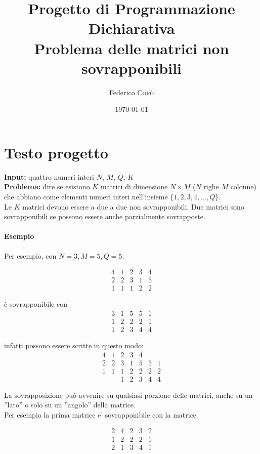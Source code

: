 \documentclass{article}
\title{{\Large Progetto di Programmazione Dichiarativa} \\ Problema delle matrici non sovrapponibili} %
\author{Federico \textsc{Corò}} %
\date{\today} %
\begin{document}
\maketitle

\section*{Testo progetto}
\textbf{Input:} quattro numeri interi $N$, $M$, $Q$, $K$\\
\textbf{Problema:} dire se esistono $K$ matrici di dimensione $N\times M$ ($N$ righe $M$ colonne)
che abbiano come elementi numeri interi nell'insieme $\{1,2,3,4,\dots,Q\}$.\\
Le $K$ matrici devono essere a due a due non sovrapponibili. Due matrici sono sovrapponibili se possono essere anche parzialmente sovrapposte.

\paragraph*{Esempio}
Per esempio, con $N=3, M=5, Q=5$:

$$
\begin{array}{ccccc}
4 & 1 & 2 & 3 & 4 \\
2 & 2 & 3 & 1 & 5 \\
1 & 1 & 1 & 2 & 2
\end{array}
$$

è sovrapponibile con
$$
\begin{array}{ccccc}
3 & 1 & 5 & 5 & 1 \\
1 & 2 & 2 & 2 & 1 \\
1 & 2 & 3 & 4 & 4
\end{array}
$$

infatti possono essere scritte in questo modo:
$$
\begin{array}{ccccccc}
4 & 1 & 2 & 3 & 4 &   &   \\
2 & 2 & 3 & 1 & 5 & 5 & 1 \\
1 & 1 & 1 & 2 & 2 & 2 & 2 \\
  &   & 1 & 2 & 3 & 4 & 4
  \end{array}
$$

La sovrapposizione può avvenire su qualsiasi porzione delle matrici,
anche su un ''lato'' o solo su un ''angolo'' della matrice.\\
Per esempio la prima matrice e' sovrapponibile con la matrice

$$
\begin{array}{ccccc}
2 & 4 & 2 & 3 & 2 \\
1 & 2 & 2 & 2 & 1 \\
2 & 1 & 3 & 4 & 1
\end{array}
$$
\end{document}

